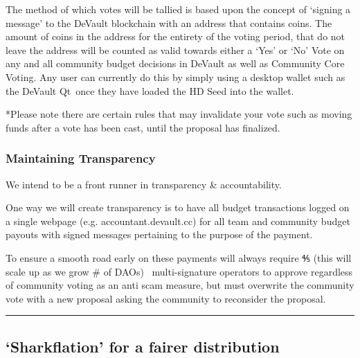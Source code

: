 {The method of which votes will be tallied is based upon the concept of
`signing a message' to the DeVault blockchain with an address that
contains coins. The amount of coins in the address for the entirety of
the voting period, that do not leave the address will be counted as
valid towards either a `Yes' or `No' Vote on any and all community
budget decisions in DeVault as well as Community Core Voting. Any user
can currently do this by simply using a desktop wallet such as the
}{DeVault Qt}{~once they have loaded the HD Seed into the wallet. }

{*Please note there are certain rules that may invalidate your vote such
as moving funds after a vote has been cast, until the proposal has
finalized. }

\hypertarget{h.vh4w65alghcu}{%
\subsubsection{\texorpdfstring{{Maintaining
Transparency}}{Maintaining Transparency}}\label{h.vh4w65alghcu}}

{We intend to be a front runner in transparency \& accountability. }

{}

{One way we will create transparency is to have all budget transactions
logged on a single webpage (e.g. accountant.devault.cc) for all team and
community budget payouts with signed messages pertaining to the purpose
of the payment.}

{}

{To ensure a smooth road early on these payments will always require ⅘
(this will scale up as we grow \# of DAOs) ~multi-signature operators to
approve regardless of community voting as an anti scam measure, but must
overwrite the community vote with a new proposal asking the community to
reconsider the proposal. }

\begin{center}\rule{0.5\linewidth}{\linethickness}\end{center}

\hypertarget{h.7imft9llrxlk}{%
\subsection{\texorpdfstring{{}}{}}\label{h.7imft9llrxlk}}

\hypertarget{h.ey1iifm4kamk}{%
\subsection{\texorpdfstring{{`Sharkflation' for a fairer
distribution}}{`Sharkflation' for a fairer distribution}}\label{h.ey1iifm4kamk}}

